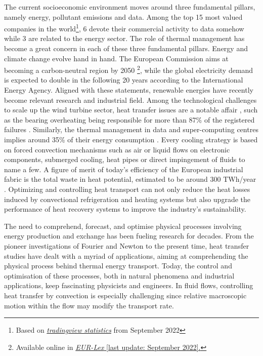 The current socioeconomic environment moves around three fundamental pillars, namely energy, pollutant emissions and data. Among the top 15 most valued companies in the world\footnote{Based on \href{https://www.tradingview.com/markets/world-economy/worlds-largest-companies/}{\textit{tradingview statistics}} from September 2022}, 6 devote their commercial activity to data somehow while 3 are related to the energy sector. The role of thermal management has become a great concern in each of these three fundamental pillars.
Energy and climate change evolve hand in hand. The European Commission aims at becoming a carbon-neutral region by 2050 \citep{EUC2018}\footnote{Available online in  \href{https://eur-lex.europa.eu/legal-content/EN/TXT/?uri=CELEX\%3A52018DC0773}{\textit{EUR-Lex} [last update: September 2022].}}, while the global electricity demand is expected to double in the following 20 years according to the International Energy Agency. Aligned with these statements, renewable energies have recently become relevant research and industrial field. Among the technological challenges to scale up the wind turbine sector, heat transfer issues are a notable affair \citep{Sunden2017heatwind}, such as the bearing overheating being responsible for more than 87\% of the registered failures \citep{Ren2021windturb}.
Similarly, the thermal management in data and super-computing centres implies around 35\% of their energy consumption \citep{Nadjahi2018DCcooling}. Every cooling strategy is based on forced convection mechanisms such as air or liquid flows on electronic components, submerged cooling, heat pipes or direct impingement of fluids to name a few.  
A figure of merit of today's efficiency of the European industrial fabric is the total waste in heat potential, estimated to be around 300 TWh/year \citep{Papapetrou2018thermalloss}. Optimizing and controlling heat transport can not only reduce the heat losses induced by convectional refrigeration and heating systems but also upgrade the performance of heat recovery systems \citep{Xu2019LHrecovery} to improve the industry's sustainability.

The need to comprehend, forecast, and optimise physical processes involving energy production and exchange has been fueling research for decades. From the pioneer investigations of Fourier and Newton to the present time, heat transfer studies have dealt with a myriad of applications, aiming at comprehending the physical process behind thermal energy transport. Today, the control and optimisation of these processes, both in natural phenomena and industrial applications, keep fascinating physicists and engineers. In fluid flows, controlling heat transfer by convection is especially challenging since relative macroscopic motion within the flow may modify the transport rate. \\

